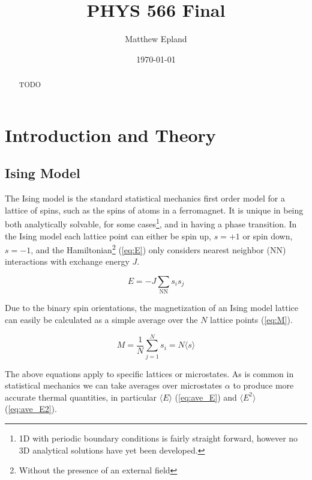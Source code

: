 \documentclass[notitlepage,aps,prd,nofootinbib]{revtex4-1}
\begin{document}
\title{PHYS 566 Final}
\author{Matthew Epland}

\date{\today}

\begin{abstract}
TODO
\end{abstract}\maketitle

\section{Introduction and Theory}
\label{sec:theory}
\subsection{Ising Model}
\label{subsec:ising}
The Ising model is the standard statistical mechanics first order model for a lattice of spins, such as the spins of atoms in a ferromagnet. It is unique in being both analytically solvable, for some cases\footnote{1D with periodic boundary conditions is fairly straight forward, however no 3D analytical solutions have yet been developed.}, and in having a phase transition. In the Ising model each lattice point can either be spin up, $s=+1$ or spin down, $s=-1$, and the Hamiltonian\footnote{Without the presence of an external field} (\ref{eq:E}) only considers nearest neighbor (NN) interactions with exchange energy $J$.

\begin{equation}
\label{eq:E}
E = -J \sum_{\mathrm{NN}} s_{i} s_{j}
\end{equation}

Due to the binary spin orientations, the magnetization of an Ising model lattice can easily be calculated as a simple average over the $N$ lattice points (\ref{eq:M}).

\begin{equation}
\label{eq:M}
M = \frac{1}{N} \sum_{j=1}^{N} s_{i} = N \langle s \rangle
\end{equation}

The above equations apply to specific lattices or microstates. As is common in statistical mechanics we can take averages over microstates $\alpha$ to produce more accurate thermal quantities, in particular $\langle E \rangle$ (\ref{eq:ave_E}) and $\langle E^{2} \rangle$ (\ref{eq:ave_E2}).
\end{document}
